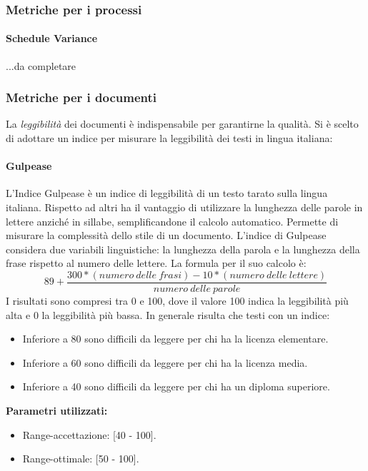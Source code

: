 		\subsubsection{Metriche per i processi}
			\paragraph{Schedule Variance}		
			...da completare	
			
		\subsubsection{Metriche per i documenti}
		La \emph{leggibilità} dei documenti è indispensabile per garantirne la qualità. Si è scelto di adottare un indice per misurare la leggibilità dei testi in lingua italiana:
			\paragraph{Gulpease}
			L'Indice Gulpease è un indice di leggibilità di un testo tarato sulla lingua italiana. Rispetto ad altri ha il vantaggio di utilizzare la lunghezza delle parole in lettere anziché in sillabe, semplificandone il calcolo automatico. Permette di misurare la complessità dello stile di un documento.
			L'indice di Gulpease considera due variabili linguistiche: la lunghezza della parola e la lunghezza della frase rispetto al numero delle lettere.
			La formula per il suo calcolo è: \\
			\[
			89 + \frac{300 * (numero\ delle\ frasi) - 10 * (numero\ delle\ lettere)}{numero\ delle\ parole}
			\]
			I risultati sono compresi tra 0 e 100, dove il valore 100 indica la leggibilità più alta e 0 la leggibilità più bassa. In generale risulta che testi con un indice:
			\begin{itemize}
				\item Inferiore a 80 sono difficili da leggere per chi ha la licenza elementare.
				\item Inferiore a 60 sono difficili da leggere per chi ha la licenza media.
				\item Inferiore a 40 sono difficili da leggere per chi ha un diploma superiore.
			\end{itemize}
			\textbf{Parametri utilizzati:}
			\begin{itemize}
				\item Range-accettazione: [40 - 100].
				\item Range-ottimale: [50 - 100].
			\end{itemize}
			
